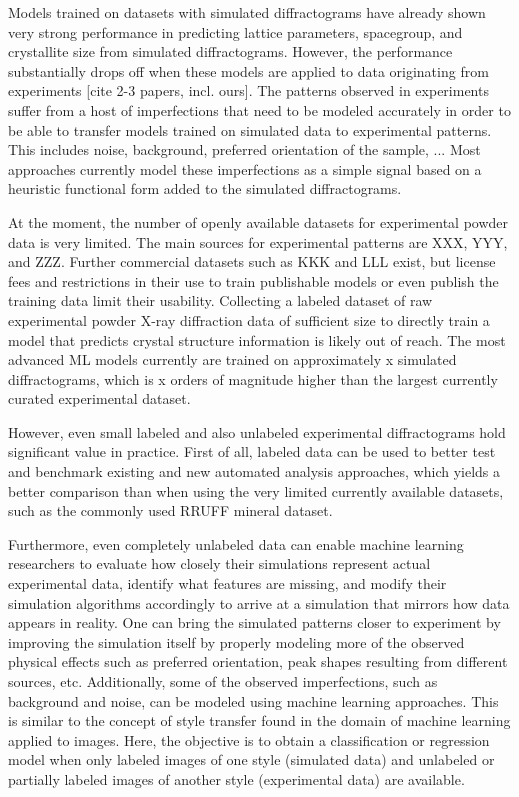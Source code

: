 Models trained on datasets with simulated diffractograms have already shown very strong performance in predicting
lattice parameters, spacegroup, and crystallite size from simulated diffractograms.
However, the performance substantially drops off when these models are applied to data originating from experiments [cite 2-3 papers, incl. ours].
The patterns observed in experiments suffer from a host of imperfections that need to be modeled accurately in order to be able to transfer models trained on simulated data to experimental patterns. This includes noise, background, preferred orientation of the sample, ...
Most approaches currently model these imperfections as a simple signal based on a heuristic functional form added to the simulated diffractograms.

At the moment, the number of openly available datasets for experimental powder data is very limited.
The main sources for experimental patterns are XXX, YYY, and ZZZ.
Further commercial datasets such as KKK and LLL exist, but license fees and restrictions in their use to train publishable models or even publish the training data limit their usability.
Collecting a labeled dataset of raw experimental powder X-ray diffraction data of sufficient size to directly train a model that predicts crystal structure information is likely out of reach.
The most advanced ML models currently are trained on approximately x simulated diffractograms, which is x orders of magnitude higher than the largest currently curated experimental dataset.

However, even small labeled and also unlabeled experimental diffractograms hold significant value in practice. First of all, labeled data can be used to better test and benchmark existing and new automated analysis approaches, which yields a better comparison than when using the very limited currently available datasets, such as the commonly used RRUFF mineral dataset.

Furthermore, even completely unlabeled data can enable machine learning researchers to evaluate how closely their simulations represent actual experimental data, identify what features are missing, and modify their simulation algorithms accordingly to arrive at a simulation that mirrors how data appears in reality.
One can bring the simulated patterns closer to experiment by improving the simulation itself by properly modeling more of the observed physical effects such as preferred orientation, peak shapes resulting from different sources, etc.
Additionally, some of the observed imperfections, such as background and noise, can be modeled using machine learning approaches.
This is similar to the concept of style transfer\cite{Gatys2016,Ganin2015} found in the domain of machine learning applied to images.
Here, the objective is to obtain a classification or regression model when only labeled images of one style (simulated data) and unlabeled or partially labeled images of another style (experimental data) are available.

